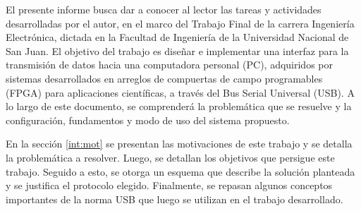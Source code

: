 El presente informe busca dar a conocer al lector las tareas y actividades desarrolladas por el autor, en el marco del Trabajo Final de la carrera Ingeniería Electrónica, dictada en la Facultad de Ingeniería de la Universidad Nacional de San Juan. El objetivo del trabajo es diseñar e implementar una interfaz para la transmisión de datos hacia una computadora personal (PC), adquiridos por sistemas desarrollados en arreglos de compuertas de campo programables (FPGA) para aplicaciones científicas, a través del Bus Serial Universal (USB). A lo largo de este documento, se comprenderá la problemática que se resuelve y la configuración, fundamentos y modo de uso del sistema propuesto.%


En la sección \ref{int:mot} se presentan las motivaciones de este trabajo y se detalla la problemática a resolver. Luego, se detallan los objetivos que persigue este trabajo. Seguido a esto, se otorga un esquema que describe la solución planteada y se justifica el protocolo elegido. Finalmente, se repasan algunos conceptos importantes de la norma USB que luego se utilizan en el trabajo desarrollado.